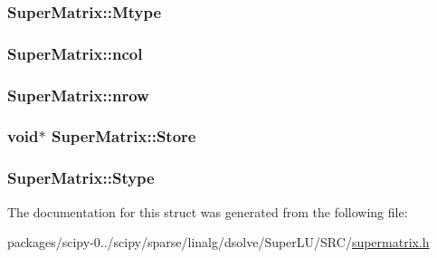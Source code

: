 \subsubsection[{Mtype}]{ Super\+Matrix\+::\+Mtype}\label{structSuperMatrix_a42877db0cfad1033374474f48e4b3fc4}
\hypertarget{structSuperMatrix_ab8b85bf206c36ebc2223cc2ec6acbe8c}{}
\subsubsection[{ncol}]{ Super\+Matrix\+::ncol}\label{structSuperMatrix_ab8b85bf206c36ebc2223cc2ec6acbe8c}
\hypertarget{structSuperMatrix_ab1d854b814f0757e7ff7e0da01c6ef43}{}
\subsubsection[{nrow}]{ Super\+Matrix\+::nrow}\label{structSuperMatrix_ab1d854b814f0757e7ff7e0da01c6ef43}
\hypertarget{structSuperMatrix_a73ebca1b46bb24536226b9378e01c5b5}{}
\subsubsection[{Store}]{\setlength{\rightskip}{0pt plus 5cm}void$\ast$ Super\+Matrix\+::\+Store}\label{structSuperMatrix_a73ebca1b46bb24536226b9378e01c5b5}
\hypertarget{structSuperMatrix_ab37e181824f50a405272451afc399952}{}
\subsubsection[{Stype}]{ Super\+Matrix\+::\+Stype}\label{structSuperMatrix_ab37e181824f50a405272451afc399952}


The documentation for this struct was generated from the following file\+:\begin{DoxyCompactItemize}
\item 
packages/scipy-\/0../scipy/sparse/linalg/dsolve/\+Super\+L\+U/\+S\+R\+C/\hyperlink{supermatrix_8h}{supermatrix.\+h}\end{DoxyCompactItemize}

